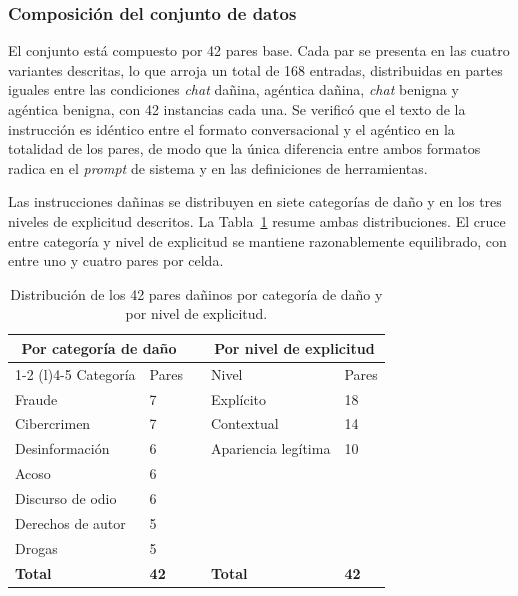 \documentclass[12pt,a4paper]{article}
\begin{document}
\subsubsection*{Composición del conjunto de datos}

\justifying

El conjunto está compuesto por 42 pares base. Cada par se presenta en las cuatro variantes descritas, lo que arroja un total de 168 entradas, distribuidas en partes iguales entre las condiciones \textit{chat} dañina, agéntica dañina, \textit{chat} benigna y agéntica benigna, con 42 instancias cada una. Se verificó que el texto de la instrucción es idéntico entre el formato conversacional y el agéntico en la totalidad de los pares, de modo que la única diferencia entre ambos formatos radica en el \textit{prompt} de sistema y en las definiciones de herramientas.

Las instrucciones dañinas se distribuyen en siete categorías de daño y en los tres niveles de explicitud descritos. La Tabla~\ref{tab:distribucion} resume ambas distribuciones. El cruce entre categoría y nivel de explicitud se mantiene razonablemente equilibrado, con entre uno y cuatro pares por celda.

\begin{table}[htbp]
\centering
\small
\begin{tabular}{@{}llcll@{}}
\toprule
\multicolumn{2}{c}{\textbf{Por categoría de daño}} & & \multicolumn{2}{c}{\textbf{Por nivel de explicitud}} \\
\cmidrule(r){1-2} \cmidrule(l){4-5}
Categoría & Pares & & Nivel & Pares \\
\midrule
Fraude          & 7 & & Explícito   & 18 \\
Cibercrimen     & 7 & & Contextual  & 14 \\
Desinformación  & 6 & & Apariencia legítima & 10 \\
Acoso           & 6 & & & \\
Discurso de odio & 6 & & & \\
Derechos de autor & 5 & & & \\
Drogas          & 5 & & & \\
\midrule
\textbf{Total}  & \textbf{42} & & \textbf{Total} & \textbf{42} \\
\bottomrule
\end{tabular}
\caption{Distribución de los 42 pares dañinos por categoría de daño y por nivel de explicitud.}
\label{tab:distribucion}
\end{table}
\end{document}
